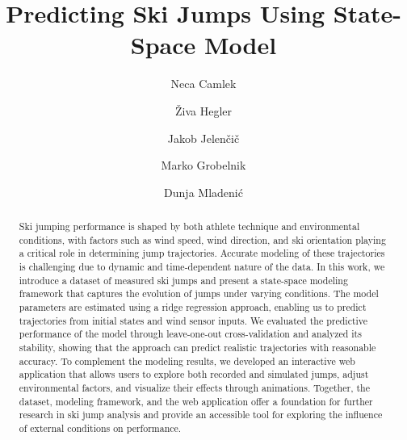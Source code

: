 \documentclass[sigconf,natbib=false, language=english]{acmart}
\begin{document}
\title[Ski Jumping Simulation]{Predicting Ski Jumps Using State-Space Model}

\author{Neca Camlek}
  
\author{Živa Hegler}
\authornotemark[1] 
  
\author{Jakob Jelenčič}

\author{Marko Grobelnik}

\author{Dunja Mladenić}


\renewcommand{\shortauthors}{Ž. Hegler, N. Camlek et al.}


\begin{abstract}

Ski jumping performance is shaped by both athlete technique and environmental conditions, with factors such as wind speed, wind direction, and ski orientation playing a critical role in determining jump trajectories. Accurate modeling of these trajectories is challenging due to dynamic and time-dependent nature of the data. In this work, we introduce a dataset of measured ski jumps and present a state-space modeling framework that captures the evolution of jumps under varying conditions. The model parameters are estimated using a ridge regression approach, 
enabling us to predict trajectories from initial states and wind sensor inputs. 
We evaluated the predictive performance of the model through leave-one-out cross-validation and analyzed its stability, showing that the approach can predict realistic trajectories with reasonable accuracy. To complement the modeling results, we developed an interactive web application that allows users to explore both recorded and simulated jumps, adjust environmental factors, and visualize their effects through animations. Together, the dataset, modeling framework, and the web application offer a foundation for further research in ski jump analysis and provide an accessible tool for exploring the influence of external conditions on performance.

\end{abstract}
\end{document}
